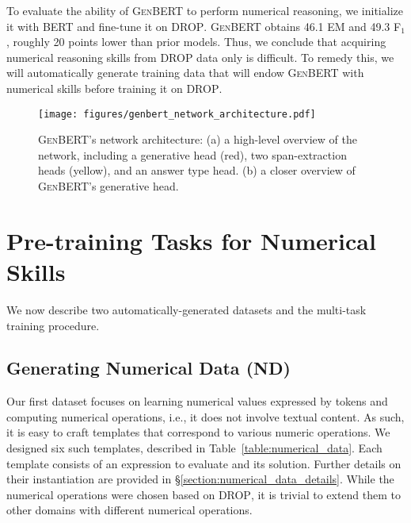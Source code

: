 \documentclass[11pt,a4paper]{article}
\newcommand\bert{\textsc{BERT}}
\newcommand\genbert{\textsc{GenBERT}}
\newcommand\drop{\textsc{DROP}}
\begin{document}
To evaluate the ability of \genbert{} to perform numerical reasoning, we
initialize it with \bert{} and fine-tune it on \drop{}. \genbert{} obtains 46.1
EM and 49.3 F$_1$, roughly 20 points
lower than prior models. Thus, we conclude that acquiring numerical reasoning
skills from \drop{} data only is difficult. 
To remedy this, we will 
automatically generate training data that will endow \genbert{} with numerical
skills before training it on \drop{}.











\begin{figure}
\setlength{\belowcaptionskip}{-10pt}
    \centering
    \texttt{[image: figures/genbert\_network\_architecture.pdf]}
    \caption{\genbert{}'s network architecture: (a) a high-level overview of the network, including a generative head (red), two span-extraction heads (yellow), and an answer type head. (b) a closer overview of \genbert{}'s generative head.}
    \label{figure:network_architecture}
\end{figure}
 \section{Pre-training Tasks for Numerical Skills}
\label{sec:pre_training_tasks}
We now describe two automatically-generated datasets and the
multi-task training procedure.


\subsection{Generating Numerical Data (ND)}
\label{section:numerical_data}
Our first dataset focuses on learning numerical values expressed by tokens
and computing numerical operations, i.e., it does not involve textual content.
As such, it is easy to craft templates that correspond to various numeric operations.
We designed six such templates, described in Table~\ref{table:numerical_data}. Each template consists of an expression to evaluate and its solution. Further details on their instantiation are provided in \S\ref{section:numerical_data_details}. While the numerical operations were chosen based on \drop{}, it is trivial to extend them to other domains \cite{saxton2019analysing} with different numerical operations.
\end{document}
